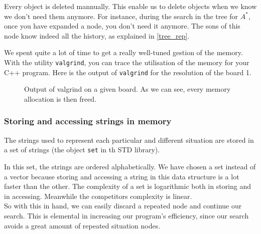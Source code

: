 \documentclass[journal]{IEEEtran}
\newcommand{\imageWithoutFigure}[2] { %
\fbox {\imageWithoutFigureAndBox{#1}{#2} }
}
\newcommand{\imageWithoutFigureAndBox}[2] { %
\texttt{[image: ./images/\#1.png]}
}
\newcommand{\Figure}[3] { %
\begin{figure}[!ht]
\centering{#1}
\caption{#2
\label{#3}
}
\end{figure}
}
\newcommand{\image}[4] { %
\Figure{\imageWithoutFigure{#1}{#2}} {#3} {#4}
}
\begin{document}
Every object is deleted mannually.
This enable us to delete objects when we know we don't need them anymore.
For instance, during the search in the tree for $A^*$, once you have expanded a node,
you don't need it anymore.
The sons of this node know indeed all the history, as explained in \ref{tree_rep}.

We spent quite a lot of time to get a really well-tuned gestion of the memory.
With the utility \verb|valgrind|, you can trace the utilisation of the memory for your C++ program.
Here is the output of \verb|valgrind| for the resolution of the board 1.

\image
    {valgrind}
    {1.5}
    {Output of valgrind on a given board. As we can see, every memory allocation is then freed.}
    {fig:valgrind}

\subsubsection{Storing and accessing strings in memory}
The strings used to represent each particular and different situation are stored in a set of strings
(the object \verb|set| in th STD library).

In this set, the strings are ordered alphabetically. We have chosen a set instead of a vector because storing and accessing a string in this data structure is a lot faster than the other. The complexity of a set is logarithmic both in storing and in accessing. Meanwhile the competitors complexity is linear.
\\
So with this in hand, we can easily discard a repeated node and continue our search. This is elemental in increasing our program's efficiency, since our search avoids a great amount of repeated situation nodes.
\end{document}
